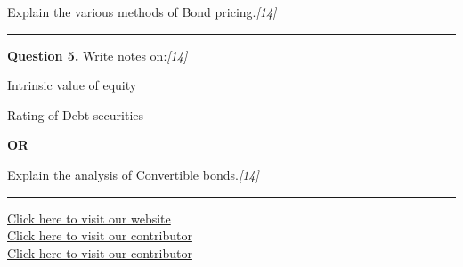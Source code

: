 \documentclass[11pt,a4paper]{article}
\newcommand{\pts}[1]{\hfill   \textit{[#1]}}
\begin{document}
Explain the various methods of Bond pricing.\pts{14}

\medskip\rule{\linewidth}{0.2pt}




\noindent   \textbf{Question 5.}
Write notes on:\pts{14}

\begin{parts}
  \item Intrinsic value of equity
  \item Rating of Debt securities
\end{parts}

\centerline{   \textbf{OR}}

Explain the analysis of Convertible bonds.\pts{14}

\vfill
\rule{\linewidth}{0.4pt}

\begin{center}\small
\href{https://bhu-exam.vercel.app/}{Click here to visit our website}\\[4pt]
\href{https://me-aryan.vercel.app/}{Click here to visit our contributor}\\[4pt]
\href{https://quashan-me.vercel.app/}{Click here to visit our contributor}
\end{center}
\end{document}
